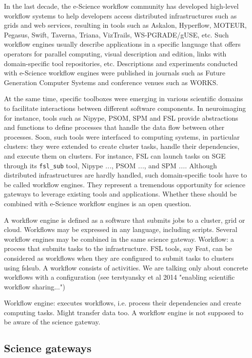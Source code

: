 \documentclass[preprint,3p,twocolumn]{elsarticle}
\newcommand{\todo}[1]{\color{blue}\xspace\emph{#1}\xspace\color{black}}
\begin{document}
In the last decade, the e-Science workflow community has developed
high-level workflow systems to help developers access distributed
infrastructures such as grids and web services, resulting in tools
such as Askalon, Hyperflow, MOTEUR, Pegasus, Swift, Taverna, Triana,
VizTrails, WS-PGRADE/gUSE, etc. Such workflow engines usually describe
applications in a specific language that offers operators for parallel
computing, visual description and edition, links with domain-specific
tool repositories, etc. Descriptions and experiments conducted with
e-Science workflow engines were published in journals such as Future
Generation Computer Systems and conference venues such as
WORKS. 

At the same time, specific toolboxes were emerging in various
scientific domains to facilitate interactions between different
software components. In neuroimaging for instance, tools such as
Nipype, PSOM, SPM and FSL provide abstractions and functions to define
processes that handle the data flow between other processes. Soon,
such tools were interfaced to computing systems, in particular
clusters: they were extended to create cluster tasks, handle their
dependencies, and execute them on clusters. For instance, FSL can
launch tasks on SGE through its \texttt{fsl\_sub} tool, Nipype
\todo{...}, PSOM \todo{...}, and SPM \todo{...}. Although distributed
infrastructures are hardly handled, such domain-specific tools have to
be called workflow engines. They represent a tremendous opportunity
for science gateways to leverage existing tools and
applications. Whether these should be combined with e-Science workflow
engines is an open question.

A workflow engine is defined as a software that submits jobs to a
cluster, grid or cloud. Workflows may be expressed in any language,
including scripts. Several workflow engines may be combined in the
same science gateway. Workflow: a process that submits tasks to the
infrastructure. FSL tools, say Feat, can be considered as workflows
when they are configured to submit tasks to clusters using fslsub. A
workflow consists of activities. We are talking only about concrete
workflows with a configuration (see terstyansky et al 2014 "enabling
scientific workflow sharing...")

  Workflow engine: executes workflows, i.e. process their dependencies
  and create computing tasks. Might transfer data too. A workflow
  engine is not supposed to be aware of the science gateway.

\subsection{Science gateways}
\end{document}
